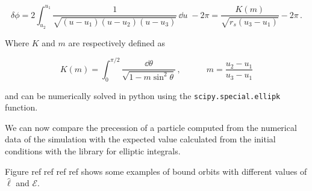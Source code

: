 \begin{equation}
    \delta \phi = 2 \int_{u_2}^{u_1} \frac{1}{\sqrt{(u - u_1)(u - u_2)(u - u_3)}}
    \, \dd{u} \; - 2 \pi
    = \frac{K(m)}{\sqrt{r_s (u_3 - u_1)}} - 2 \pi \, .
\end{equation}

Where $K$ and $m$ are respectively defined as

\begin{equation}
    K(m) = \int_0^{\pi/2} \frac{\dd{\theta}}{\sqrt{1 - m \sin^2 \theta}} \, ,
    \quad \quad \quad
    m = \frac{u_2 - u_1}{u_3 - u_1}
\end{equation}

and can be numerically solved in python using the \texttt{scipy.special.ellipk}
function.

We can now compare the precession of a particle computed from the numerical data
of the simulation with the expected value calculated from the initial conditions
with the library for elliptic integrals.

Figure ref ref ref ref
shows some examples of bound orbits with different values of $\hat \ell$ and
$\mathcal E$.

